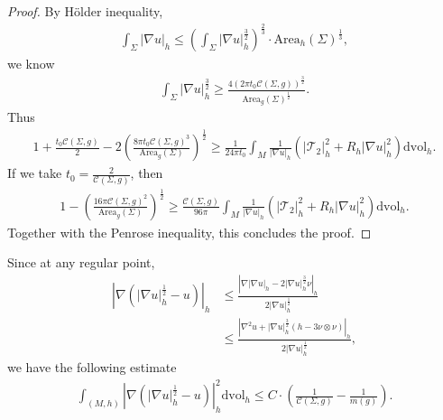 \documentclass[letter]{amsart}
\theoremstyle{definition}
\theoremstyle{remark}
\begin{document}
\begin{proof}
By H\"older inequality, 
\begin{align*}
	\int_{\Sigma }|\nabla u|_h \leq \left( \int_{\Sigma }|\nabla u|_h^{\frac{3}{2}} \right) ^{\frac{2}{3}} \cdot \mathrm{Area}_h(\Sigma ) ^{\frac{1}{3}},
\end{align*}
we know
\begin{align*}
	\int_{\Sigma }|\nabla u|_h^{\frac{3}{2}} \geq \frac{4 \left( 2 \pi t_0 \mathcal{C}(\Sigma ,g) \right) ^{\frac{3}{2}}}{\mathrm{Area}_g (\Sigma ) ^{\frac{1}{2}}}.
\end{align*}
Thus
\begin{align*}
	1 + \frac{t_0 \mathcal{C}(\Sigma ,g)}{2} - 2\left( \frac{8 \pi t_0 \mathcal{C}(\Sigma ,g)^{3}}{\mathrm{Area}_g(\Sigma )} \right) ^{\frac{1}{2}} \geq \frac{1}{24 \pi t_0} \int_{M} \frac{1}{|\nabla u|_h}\left( |\mathcal{T}_2|_h^2 + R_h |\nabla u|_h^2 \right) \mathrm{dvol}_h.
\end{align*}
If we take $t_0 = \frac{2}{\mathcal{C}(\Sigma ,g)}$, then 
\begin{align*}
	1 - \left( \frac{16 \pi \mathcal{C}(\Sigma ,g)^2}{\mathrm{Area}_g(\Sigma )} \right) ^{\frac{1}{2}} \geq \frac{\mathcal{C}(\Sigma ,g)}{96 \pi} \int_{M} \frac{1}{|\nabla u|_h}\left( |\mathcal{T}_2|_h^2 + R_h |\nabla u|_h^2 \right) \mathrm{dvol}_h.
\end{align*}
Together with the Penrose inequality, this concludes the proof.
\end{proof}

Since at any regular point,
\begin{align*}
	\left| \nabla \left( |\nabla u|_h^{\frac{1}{2}} - u\right) \right|_h &\leq \frac{\left| \nabla |\nabla u|_h - 2 |\nabla u|_h^{\frac{3}{2}} \nu \right|_h}{2 |\nabla u|_h^{\frac{1}{2}}}\\
						   &\leq \frac{ \left|\nabla ^2 u + |\nabla u|_h^{\frac{3}{2}} (h - 3 \nu \otimes \nu )\right|_h}{2 |\nabla u|_h^{\frac{1}{2}}},
\end{align*}
we have the following estimate
\begin{align}
	\int_{(M,h)} \left|\nabla \left( |\nabla u|_h^{\frac{1}{2}} - u\right) \right|_h^2 \mathrm{dvol}_h \leq C\cdot \left( \frac{1}{\mathcal{C}(\Sigma ,g)}- \frac{1}{m(g)} \right) .
\end{align}
\end{document}
